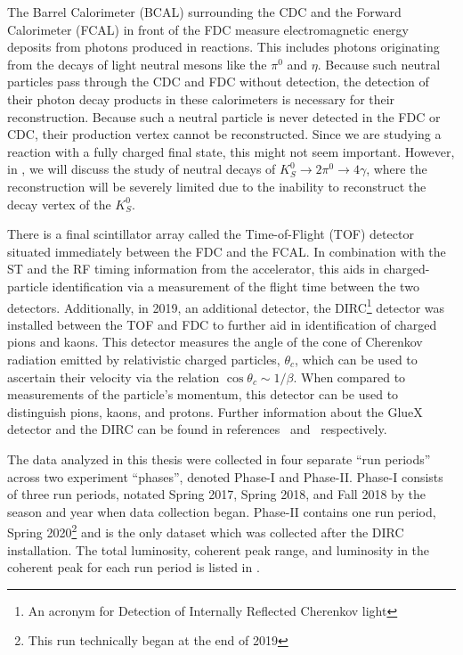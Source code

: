 The Barrel Calorimeter (BCAL) surrounding the CDC and the Forward Calorimeter (FCAL) in front of the FDC measure electromagnetic energy deposits from photons produced in reactions. This includes photons originating from the decays of light neutral mesons like the $\pi^0$ and $\eta$. Because such neutral particles pass through the CDC and FDC without detection, the detection of their photon decay products in these calorimeters is necessary for their reconstruction. Because such a neutral particle is never detected in the FDC or CDC, their production vertex cannot be reconstructed. Since we are studying a reaction with a fully charged final state, this might not seem important. However, in , we will discuss the study of neutral decays of $K_S^0\to 2\pi^0 \to 4\gamma$, where the reconstruction will be severely limited due to the inability to reconstruct the decay vertex of the $K_S^0$.

There is a final scintillator array called the Time-of-Flight (TOF) detector situated immediately between the FDC and the FCAL. In combination with the ST and the RF timing information from the accelerator, this aids in charged-particle identification via a measurement of the flight time between the two detectors. Additionally, in 2019, an additional detector, the DIRC\footnote{An acronym for Detection of Internally Reflected Cherenkov light} detector was installed between the TOF and FDC to further aid in identification of charged pions and kaons. This detector measures the angle of the cone of Cherenkov radiation emitted by relativistic charged particles, $\theta_c$, which can be used to ascertain their velocity via the relation $\cos\theta_c \sim 1/\beta$. When compared to measurements of the particle's momentum, this detector can be used to distinguish pions, kaons, and protons. Further information about the GlueX detector and the DIRC can be found in references~\cite{Adhikari2021} and~\cite{Ali2020} respectively.

The data analyzed in this thesis were collected in four separate ``run periods'' across two experiment ``phases'', denoted Phase-I and Phase-II. Phase-I consists of three run periods, notated Spring 2017, Spring 2018, and Fall 2018 by the season and year when data collection began. Phase-II contains one run period, Spring 2020\footnote{This run technically began at the end of 2019} and is the only dataset which was collected after the DIRC installation. The total luminosity, coherent peak range, and luminosity in the coherent peak for each run period is listed in .



